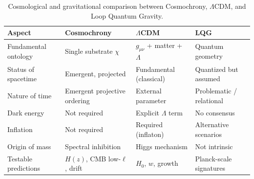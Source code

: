  \begin{table}[htbp]
    \centering
    \renewcommand{\arraystretch}{1.2}
    \begin{tabular}{|p{4.2cm}|p{3.5cm}|p{3.5cm}|p{3.5cm}|}
      \hline
      \textbf{Aspect} &
      \textbf{Cosmochrony} &
      \textbf{$\Lambda$CDM} &
      \textbf{LQG} \\
      \hline
      Fundamental ontology &
      Single substrate $\chi$ &
      $g_{\mu\nu}$ + matter + $\Lambda$ &
      Quantum geometry \\
      \hline
      Status of spacetime &
      Emergent, projected &
      Fundamental (classical) &
      Quantized but assumed \\
      \hline
      Nature of time &
      Emergent projective ordering &
      External parameter &
      Problematic / relational \\
      \hline
      Dark energy &
      Not required &
      Explicit $\Lambda$ term &
      No consensus \\
      \hline
      Inflation &
      Not required &
      Required (inflaton) &
      Alternative scenarios \\
      \hline
      Origin of mass &
      Spectral inhibition &
      Higgs mechanism &
      Not intrinsic \\
      \hline
      Testable predictions &
      $H(z)$, CMB low-$\ell$, drift &
      $H_0$, $w$, growth &
      Planck-scale signatures \\
      \hline
    \end{tabular}
    \caption{Cosmological and gravitational comparison between
    Cosmochrony, $\Lambda$CDM, and Loop Quantum Gravity.}
    \label{tab:comparison_cosmochrony}
  \end{table}
